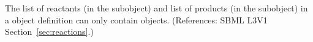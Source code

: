 The list of reactants (in the \ListOfReactants subobject) and list of
products (in the \ListOfProducts subobject) in a \Reaction object
definition can only contain \SpeciesReference objects.  (References: SBML
L3V1 Section~\ref{sec:reactions}.)
